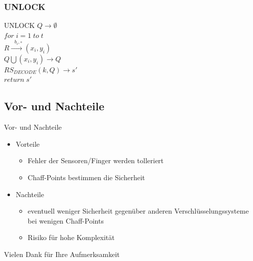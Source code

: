 \documentclass{beamer}
\begin{document}
\subsubsection{UNLOCK}
\begin{frame}{UNLOCK}
	\hspace*{10mm}$ Q \rightarrow \emptyset$ \\[1ex]
	\hspace*{10mm}$for \; i=1 \; to \; t $\\[1ex]
	\hspace*{15mm}$R \xrightarrow{\text{ $b_{i}, \circ $}} (x_{i}, y_{i})$\\[1ex]
	\hspace*{15mm}$Q\bigcup (x_{i},y_{i}) \rightarrow Q$\\[1ex]
	\hspace*{10mm}$RS_{DECODE}(k,Q) \rightarrow s'$\\[1ex]
	\hspace*{10mm}$return\; s' $\\[1ex]
\end{frame}
\subsection{Vor- und Nachteile}
\begin{frame}{Vor- und Nachteile}
\begin{itemize}
		\item Vorteile	\\[1ex]
		\begin{itemize}
			\item Fehler der Sensoren/Finger werden tolleriert
			\item Chaff-Points bestimmen die Sicherheit \\[3ex]
		\end{itemize}
		\item Nachteile \\[1ex]
		\begin{itemize}
			\item eventuell weniger Sicherheit gegenüber anderen Verschlüsselungssysteme bei wenigen Chaff-Points
			\item Risiko für hohe Komplexität
		\end{itemize}
	\end{itemize}
\end{frame}
\begin{frame}
\huge{Vielen Dank für Ihre Aufmerksamkeit}
\end{frame}
\end{document}
